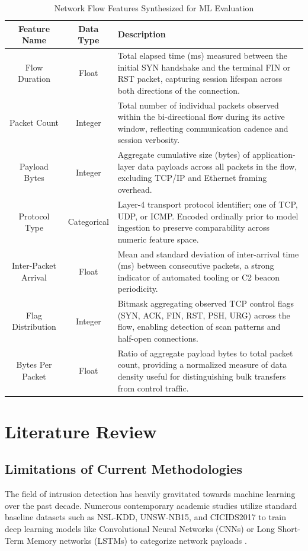 \documentclass[conference]{IEEEtran}
\begin{document}
\begin{table}[t]
\caption{Network Flow Features Synthesized for ML Evaluation}
\begin{center}
\begin{tabular}{|c|c|p{9cm}|}
\hline
\textbf{Feature Name} & \textbf{Data Type} & \textbf{Description} \\
\hline
Flow Duration & Float & Total elapsed time (ms) measured between the initial SYN handshake and the terminal FIN or RST packet, capturing session lifespan across both directions of the connection. \\
\hline
Packet Count & Integer & Total number of individual packets observed within the bi-directional flow during its active window, reflecting communication cadence and session verbosity. \\
\hline
Payload Bytes & Integer & Aggregate cumulative size (bytes) of application-layer data payloads across all packets in the flow, excluding TCP/IP and Ethernet framing overhead. \\
\hline
Protocol Type & Categorical & Layer-4 transport protocol identifier; one of TCP, UDP, or ICMP. Encoded ordinally prior to model ingestion to preserve comparability across numeric feature space. \\
\hline
Inter-Packet Arrival & Float & Mean and standard deviation of inter-arrival time (ms) between consecutive packets, a strong indicator of automated tooling or C2 beacon periodicity. \\
\hline
Flag Distribution & Integer & Bitmask aggregating observed TCP control flags (SYN, ACK, FIN, RST, PSH, URG) across the flow, enabling detection of scan patterns and half-open connections. \\
\hline
Bytes Per Packet & Float & Ratio of aggregate payload bytes to total packet count, providing a normalized measure of data density useful for distinguishing bulk transfers from control traffic. \\
\hline
\end{tabular}
\label{tab:features}
\end{center}
\end{table}

\section{Literature Review}
\subsection{Limitations of Current Methodologies}
The field of intrusion detection has heavily gravitated towards machine learning over the past decade. Numerous contemporary academic studies utilize standard baseline datasets such as NSL-KDD, UNSW-NB15, and CICIDS2017 to train deep learning models like Convolutional Neural Networks (CNNs) or Long Short-Term Memory networks (LSTMs) to categorize network payloads \cite{buczak2016}.
\end{document}
